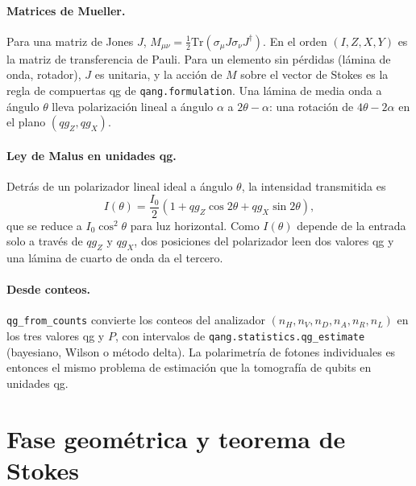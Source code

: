 \documentclass[11pt]{article}
\begin{document}
\paragraph{Matrices de Mueller.} Para una matriz de Jones $J$, $M_{\mu\nu}=\tfrac12\mathrm{Tr}(\sigma_\mu J\sigma_\nu
J^\dagger)$. En el orden $(I,Z,X,Y)$ es la matriz de transferencia de Pauli. Para un elemento sin pérdidas
(lámina de onda, rotador), $J$ es unitaria, y la acción de $M$ sobre el vector de Stokes es la regla de
compuertas qg de \texttt{qang.formulation}. Una lámina de media onda a ángulo $\theta$ lleva polarización
lineal a ángulo $\alpha$ a $2\theta-\alpha$: una rotación de $4\theta-2\alpha$ en el plano $(qg_Z,qg_X)$.

\paragraph{Ley de Malus en unidades qg.} Detrás de un polarizador lineal ideal a ángulo $\theta$, la intensidad
transmitida es
\begin{equation}
I(\theta)=\frac{I_0}{2}\left(1+qg_Z\cos2\theta+qg_X\sin2\theta\right),
\end{equation}
que se reduce a $I_0\cos^2\theta$ para luz horizontal. Como $I(\theta)$ depende de la entrada solo a través de
$qg_Z$ y $qg_X$, dos posiciones del polarizador leen dos valores qg y una lámina de cuarto de onda da el tercero.

\paragraph{Desde conteos.} \texttt{qg\_from\_counts} convierte los conteos del analizador
$(n_H,n_V,n_D,n_A,n_R,n_L)$ en los tres valores qg y $P$, con intervalos de \texttt{qang.statistics.qg\_estimate}
(bayesiano, Wilson o método delta). La polarimetría de fotones individuales es entonces el mismo problema de
estimación que la tomografía de qubits en unidades qg.

\section{Fase geométrica y teorema de Stokes}
\end{document}
